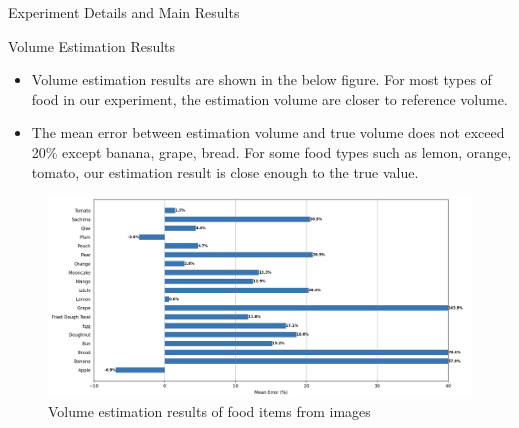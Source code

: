 \documentclass{beamer}
\begin{document}
	\begin{frame}{Experiment Details and Main Results}
		\begin{block}{Volume Estimation Results}\scriptsize
			\begin{itemize}
				\item Volume estimation results are shown in the below figure. For most types of food in our experiment, the estimation volume are closer to reference volume.
				\item The mean error between estimation volume and true volume does not exceed 20\% except banana, grape, bread. For some food types such as lemon, orange, tomato, our estimation result is close enough to the true value.
			\end{itemize}
			\begin{figure}
				\centering
				\includegraphics[scale=0.18]{vol_est.png}
				\caption{\scriptsize Volume estimation results of food items from images}
			\end{figure}
		\end{block}
	\end{frame}
	
\end{document}
